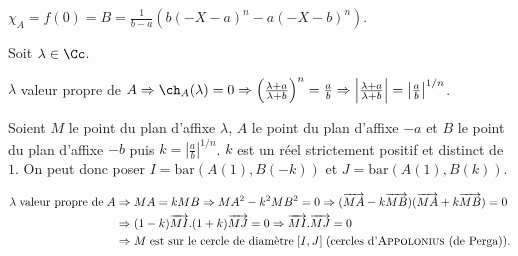 {{\begin{center}
$\chi_A= f(0)=B=\frac{1}{b-a}(b(-X-a)^n-a(-X-b)^n)$.
\end{center}

Soit $\lambda\in\Cc$.

\begin{center}
$\lambda$ valeur propre de $A\Rightarrow \ch_A(\lambda) = 0\Rightarrow\left(\frac{\lambda+a}{\lambda+b}\right)^n=\frac{a}{b}\Rightarrow\left|\frac{\lambda+a}{\lambda+b}\right|=\left|\frac{a}{b}\right|^{1/n}$.
\end{center}

Soient $M$ le point du plan d'affixe $\lambda$, $A$ le point du plan d'affixe $-a$ et $B$ le point du plan d'affixe $-b$ puis $k =\left|\frac{a}{b}\right|^{1/n}$. $k$ est un réel strictement positif et distinct de $1$. On peut donc poser $I =\text{bar}(A(1),B(-k))$ et $J =\text{bar}(A(1),B(k))$.

\begin{align*}\ensuremath
\lambda\;\text{valeur propre de}\;A&\Rightarrow MA = kMB \Rightarrow MA^2 - k^2MB^2 = 0\Rightarrow (\overrightarrow{MA}-k\overrightarrow{MB})(\overrightarrow{MA}+k\overrightarrow{MB}) = 0\\ 
 &\Rightarrow(1-k)\overrightarrow{MI}.(1+k)\overrightarrow{MJ}= 0 \Rightarrow\overrightarrow{MI}.\overrightarrow{MJ}= 0\\
  &\Rightarrow M\;\text{est sur le cercle de diamètre}\;[I,J]\;(\text{cercles d'\textsc{Appolonius} (de Perga)}).
\end{align*}
}
}
